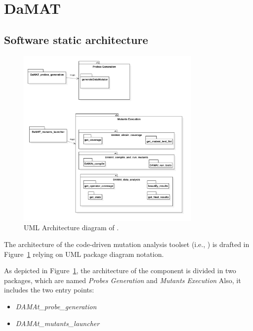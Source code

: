 
\section{DaMAT}


\subsection{Software static architecture}


\begin{figure}[h]
  \centering
	\includegraphics[width=0.8\textwidth]{images/damat_architecture_diagram.png}
      \caption{UML Architecture diagram of \dama.}
      \label{fig:damat_architecture_diagram}
\end{figure}

The architecture of the code-driven mutation analysis toolset (i.e., \dama)  is drafted in
Figure~\ref{fig:damat_architecture_diagram} relying on UML package diagram notation.

As depicted in Figure~\ref{fig:damat_architecture_diagram}, the architecture of the component is divided in two packages, which are named \textit{Probes Generation} and \textit{Mutants Execution} Also, it includes the two entry points:
\begin{itemize}
  \item \textit{DAMAt\_probe\_generation}
  \item \textit{DAMAt\_mutants\_launcher}
\end{itemize}


